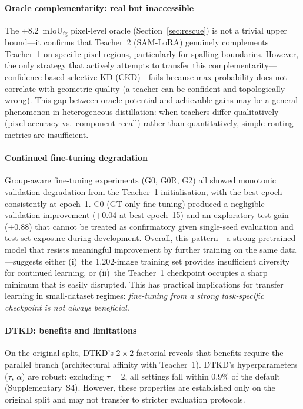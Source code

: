 \documentclass[review,authoryear]{elsarticle}
\begin{document}
\paragraph{Oracle complementarity: real but inaccessible}
The +8.2~mIoU$_{\text{fg}}$ pixel-level oracle (Section~\ref{sec:rescue}) is not a trivial upper bound---it confirms that Teacher~2 (SAM-LoRA) genuinely complements Teacher~1 on specific pixel regions, particularly for spalling boundaries.
However, the only strategy that actively attempts to transfer this complementarity---confidence-based selective KD (CKD)---fails because max-probability does not correlate with geometric quality (a teacher can be confident and topologically wrong).
This gap between oracle potential and achievable gains may be a general phenomenon in heterogeneous distillation: when teachers differ qualitatively (pixel accuracy vs.\ component recall) rather than quantitatively, simple routing metrics are insufficient.

\paragraph{Continued fine-tuning degradation}
Group-aware fine-tuning experiments (G0, G0R, G2) all showed monotonic validation degradation from the Teacher~1 initialisation, with the best epoch consistently at epoch~1.
C0 (GT-only fine-tuning) produced a negligible validation improvement (+0.04 at best epoch~15) and an exploratory test gain (+0.88) that cannot be treated as confirmatory given single-seed evaluation and test-set exposure during development.
Overall, this pattern---a strong pretrained model that resists meaningful improvement by further training on the same data---suggests either (i)~the 1{,}202-image training set provides insufficient diversity for continued learning, or (ii)~the Teacher~1 checkpoint occupies a sharp minimum that is easily disrupted.
This has practical implications for transfer learning in small-dataset regimes: \emph{fine-tuning from a strong task-specific checkpoint is not always beneficial}.

\paragraph{DTKD: benefits and limitations}
On the original split, DTKD's $2{\times}2$ factorial reveals that benefits require the parallel branch (architectural affinity with Teacher~1).
DTKD's hyperparameters ($\tau$, $\alpha$) are robust: excluding $\tau{=}2$, all settings fall within 0.9\% of the default (Supplementary~S4).
However, these properties are established only on the original split and may not transfer to stricter evaluation protocols.
\end{document}
